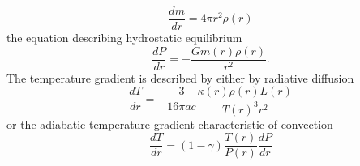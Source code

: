 \begin{equation}
    \frac{dm}{dr} = 4\pi r^2 \rho(r)
\end{equation}
the equation describing hydrostatic equilibrium
\begin{equation}
    \frac{dP}{dr} = -\frac{G m(r)\rho(r)}{r^2}.
\end{equation}
The temperature gradient is described by either by radiative diffusion
\begin{equation}
    \frac{dT}{dr} = -\frac{3}{16\pi ac}\frac{\kappa(r) \rho(r) L(r)}{T(r)^3 r^2}
\end{equation}
or the adiabatic temperature gradient characteristic of convection
\begin{equation}
    \frac{dT}{dr} = (1 - \gamma)\frac{T(r)}{P(r)}\frac{dP}{dr}
\end{equation}